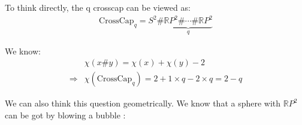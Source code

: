 \documentclass[]{ctexart}
\begin{document}
		To think directly, the q crosscap can be viewed as:
			\begin{equation*}
			\begin{aligned}
				\text{CrossCap}_q=S^2\#\underbrace{\mathbb{R}P^2\#\cdots\#\mathbb{R}P^2}_q
			\end{aligned}
			\end{equation*}
		 
		 We know:
		 	\begin{equation*}
		 	\begin{aligned}
		 		&\chi(x\# y)=\chi(x)+\chi(y)-2\\
		 		\Rightarrow &\chi(\text{CrossCap}_q)=2+1\times q-2\times q=2-q
		 	\end{aligned}
		 	\end{equation*}
		 
		We can also think this question geometrically. We know that a sphere with $\mathbb{R}P^2$ can be got by blowing a bubble :
\end{document}
